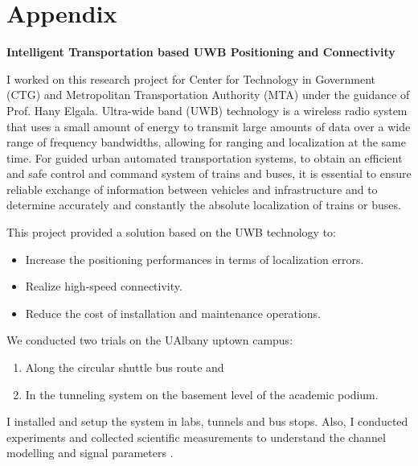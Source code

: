    \chapter{Appendix}
   \begin{center}
       
   
\large\textbf{Intelligent Transportation based UWB Positioning and Connectivity}
\end{center}
\bigskip
I worked on this research project for Center for Technology in Government (CTG) and Metropolitan Transportation Authority (MTA) under the guidance of Prof. Hany Elgala.
Ultra-wide band (UWB) technology is a wireless radio system that uses a small
amount of energy to transmit large amounts of data over a wide range of frequency bandwidths, allowing for ranging and localization at the same time. For guided urban automated transportation systems, to obtain an efficient and safe control and command system of trains and buses, it is essential to ensure reliable exchange of information between vehicles and infrastructure and to determine accurately and constantly the absolute localization of trains or buses. 

This project provided a solution based on the UWB technology to: 
\begin{itemize}

\item Increase the positioning performances in terms of localization errors. \item Realize high-speed connectivity. \item Reduce the cost of installation and maintenance operations.
\end{itemize}

 We conducted two trials on the UAlbany uptown campus: 
 \begin{enumerate}
\item Along the circular shuttle bus route and 
\item In the tunneling system on the basement level of the academic podium.
\end{enumerate}
 I installed and setup the system in labs, tunnels and bus stops. Also, I conducted experiments and collected scientific measurements to understand the channel modelling and signal parameters \cite{uwb}.

